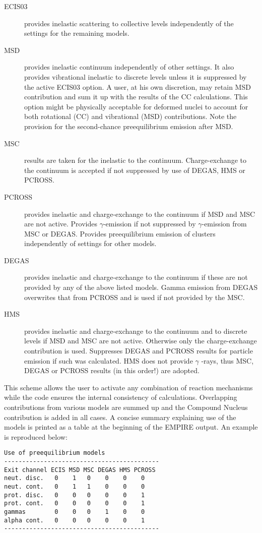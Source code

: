 \begin{description}
\item[ECIS03] provides inelastic scattering to collective levels
independently of the settings for the remaining models.

\item[MSD] provides inelastic continuum independently of other settings. It
also provides vibrational inelastic to discrete levels unless it is
suppressed by the active ECIS03 option. A user, at his own discretion, may
retain MSD contribution and sum it up with the results of the CC
calculations. This option might be physically acceptable for deformed nuclei
to account for both rotational (CC) and vibrational (MSD) contributions.
Note the provision for the second-chance preequilibrium emission after MSD.

\item[MSC] results are taken for the inelastic to the continuum.
Charge-exchange to the continuum is accepted if not suppressed by use of
DEGAS, HMS or PCROSS.

\item[PCROSS] provides inelastic and charge-exchange to the continuum if MSD
and MSC are not active. Provides $\gamma$-emission if not suppressed by $%
\gamma$-emission from MSC or DEGAS. Provides preequilibrium emission of
clusters independently of settings for other models.

\item[DEGAS] provides inelastic and charge-exchange to the continuum if
these are not provided by any of the above listed models. Gamma emission
from DEGAS overwrites that from PCROSS and is used if not provided by the
MSC.

\item[HMS] provides inelastic and charge-exchange to the continuum and to
discrete levels if MSD and MSC are not active. Otherwise only the
charge-exchange contribution is used. Suppresses DEGAS and PCROSS results
for particle emission if such was calculated. HMS does not provide $\gamma$%
-rays, thus MSC, DEGAS or PCROSS results (in this order!) are adopted.
\end{description}

This scheme allows the user to activate any combination of reaction
mechanisms while the code ensures the internal consistency of calculations.
Overlapping contributions from various models are summed up and the Compound
Nucleus contribution is added in all cases. A concise summary explaining use
of the models is printed as a table at the beginning of the EMPIRE output.
An example is reproduced below:
\begin{verbatim}
Use of preequilibrium models
-------------------------------------------
Exit channel ECIS MSD MSC DEGAS HMS PCROSS
neut. disc.   0    1   0    0    0    0
neut. cont.   0    1   1    0    0    0
prot. disc.   0    0   0    0    0    1
prot. cont.   0    0   0    0    0    1
gammas        0    0   0    1    0    0
alpha cont.   0    0   0    0    0    1
-------------------------------------------
\end{verbatim}

